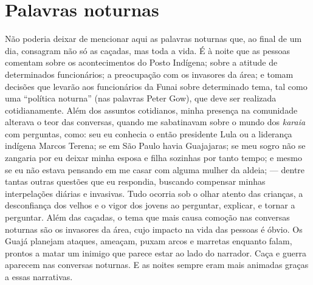 \section{Palavras noturnas }\label{palavras-noturnas}

Não poderia deixar de mencionar aqui as palavras noturnas que, ao final
de um dia, consagram não só as caçadas, mas toda a vida. É à noite que
as pessoas comentam sobre os acontecimentos do Posto Indígena; sobre a
atitude de determinados funcionários; a preocupação com os invasores da
área; e tomam decisões que levarão aos funcionários da Funai sobre
determinado tema, tal como uma ``política noturna'' (nas palavras Peter
Gow), que deve ser realizada cotidianamente. Além dos assuntos
cotidianos, minha presença na comunidade alterava o teor das conversas,
quando me sabatinavam sobre o mundo dos \emph{karaia} com perguntas,
como: seu eu conhecia o então presidente Lula ou a liderança indígena
Marcos Terena; se em São Paulo havia Guajajaras; se meu sogro não se
zangaria por eu deixar minha esposa e filha sozinhas por tanto tempo; e
mesmo se eu não estava pensando em me casar com alguma mulher da aldeia;
--- dentre tantas outras questões que eu respondia, buscando compensar
minhas interpelações diárias e invasivas. Tudo ocorria sob o olhar
atento das crianças, a desconfiança dos velhos e o vigor dos jovens ao
perguntar, explicar, e tornar a perguntar. Além das caçadas, o tema que
mais causa comoção nas conversas noturnas são os invasores da área, cujo
impacto na vida das pessoas é óbvio. Os Guajá planejam ataques, ameaçam,
puxam arcos e marretas enquanto falam, prontos a matar um inimigo que
parece estar ao lado do narrador. Caça e guerra aparecem nas conversas
noturnas. E as noites sempre eram mais animadas graças a essas
narrativas.

